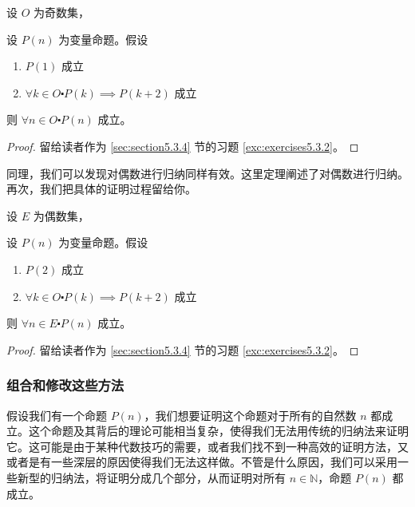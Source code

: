 \begin{theorem}[奇数上的归纳]\label{theorem5.3.5}
    设 $O$ 为奇数集，

    设 $P(n)$ 为变量命题。假设

    \begin{enumerate}[label=(\arabic*)]
        \item $P(1)$ 成立
        \item $\forall k \in O \centerdot P(k) \implies P(k + 2)$ 成立
    \end{enumerate}

    则 $\forall n \in O \centerdot P(n)$ 成立。
\end{theorem}

\begin{proof}
    留给读者作为 \ref{sec:section5.3.4} 节的习题 \ref{exc:exercises5.3.2}。
\end{proof}

同理，我们可以发现对偶数进行归纳同样有效。这里定理阐述了对偶数进行归纳。再次，我们把具体的证明过程留给你。

\begin{theorem}[偶数上的归纳]\label{theorem5.3.6}
    设 $E$ 为偶数集，

    设 $P(n)$ 为变量命题。假设

    \begin{enumerate}[label=(\arabic*)]
        \item $P(2)$ 成立
        \item $\forall k \in O \centerdot P(k) \implies P(k + 2)$ 成立
    \end{enumerate}

    则 $\forall n \in E \centerdot P(n)$ 成立。
\end{theorem}

\begin{proof}
    留给读者作为 \ref{sec:section5.3.4} 节的习题 \ref{exc:exercises5.3.2}。
\end{proof}


\subsubsection*{组合和修改这些方法}

假设我们有一个命题 $P(n)$，我们想要证明这个命题对于所有的自然数 $n$ 都成立。这个命题及其背后的理论可能相当复杂，使得我们无法用传统的归纳法来证明它。这可能是由于某种代数技巧的需要，或者我们找不到一种高效的证明方法，又或者是有一些深层的原因使得我们无法这样做。不管是什么原因，我们可以采用一些新型的归纳法，将证明分成几个部分，从而证明对所有 $n \in \mathbb{N}$，命题 $P(n)$ 都成立。

